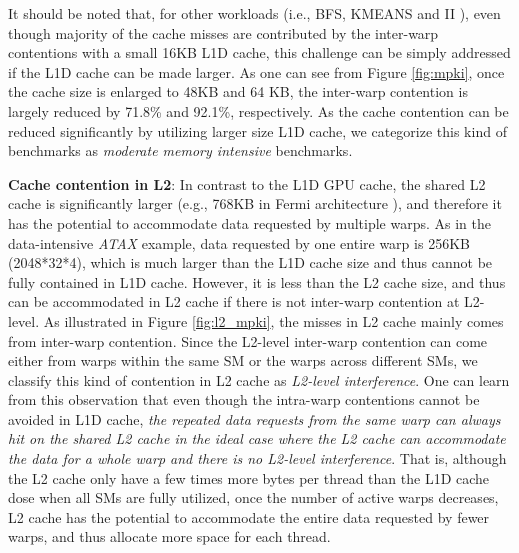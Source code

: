 \documentclass{sigplanconf}
\begin{document}
It should be noted that, for other workloads (i.e., BFS, KMEANS \cite{che2009rodinia} and II \cite{he2008mars}), even though majority of the cache misses are contributed by the inter-warp contentions with a small 16KB L1D cache, this challenge can be simply addressed if the L1D cache can be made larger. As one can see from Figure \ref{fig:mpki}, once the cache size is enlarged to 48KB and 64 KB, the inter-warp contention is largely reduced by 71.8\% and 92.1\%, respectively. As the cache contention can be reduced significantly by utilizing larger size L1D cache, we categorize this kind of benchmarks as \textit{moderate memory intensive} benchmarks.



\noindent\textbf{Cache contention in L2}: In contrast to the L1D GPU cache, the shared L2 cache is significantly larger (e.g., 768KB in Fermi architecture \cite{nvidia2009nvidia}), and therefore it has the potential to accommodate data requested by multiple warps. As in the data-intensive \textit{ATAX} example, data requested by one entire warp is 256KB (2048*32*4), which is much larger than the L1D cache size and thus cannot be fully contained in L1D cache. However, it is less than the L2 cache size, and thus can be accommodated in L2 cache if there is not inter-warp contention at L2-level. As illustrated in Figure \ref{fig:l2_mpki}, the misses in L2 cache mainly comes from inter-warp contention. Since the L2-level inter-warp contention can come either from warps within the same SM or the warps across different SMs, we classify this kind of contention in L2 cache as \textit{L2-level interference}. One can learn from this observation that even though the intra-warp contentions cannot be avoided in L1D cache, \textit{the repeated data requests from the same warp can always hit on the shared L2 cache in the ideal case where the L2 cache can accommodate the data for a whole warp and there is no L2-level interference}. That is, although the L2 cache only have a few times more bytes per thread than the L1D cache dose when all SMs are fully utilized, once the number of active warps decreases, L2 cache has the potential to accommodate the entire data requested by fewer warps, and thus allocate more space for each thread.
\end{document}
